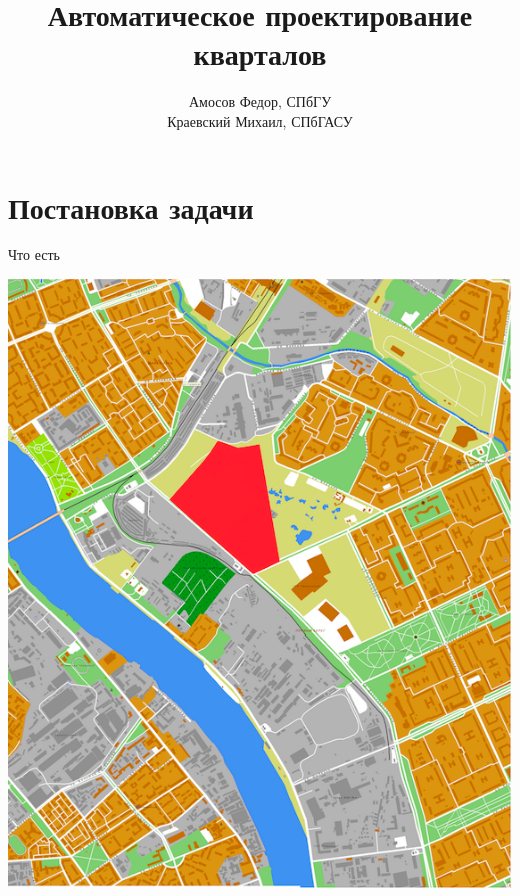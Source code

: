 \documentclass[14pt, fleqn, xcolor={dvipsnames, table}]{beamer}
\title{Автоматическое проектирование кварталов}
\author[]{
    \small{
        Амосов Федор, СПбГУ\\
        Краевский Михаил, СПбГАСУ
    }
}
\date{}
\begin{document}
    \begin{frame}
        \maketitle
        \small
    \end{frame}

    \section{Постановка задачи}  
    
        \begin{frame}{Что есть}
            \begin{center}
                \includegraphics[scale=0.26]{top-plan.png}~

\end{center}
\end{frame}
\end{document}
